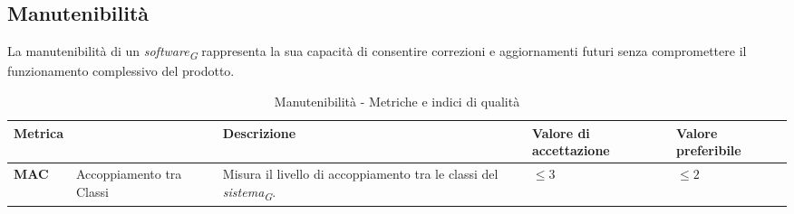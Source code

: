 \subsection{Manutenibilità}
La manutenibilità di un \textit{software}\textsubscript{\textit{G}} rappresenta la sua capacità di consentire correzioni e aggiornamenti futuri senza compromettere il funzionamento complessivo del prodotto.  
\begin{table}[H]
    \centering
    \begin{tabular}{|C{1.5cm}|L{3cm}|L{4cm}|L{2.5cm}|L{2.5cm}|}
        \hline
        \textbf{Metrica} &  & \textbf{Descrizione} & \textbf{Valore di accettazione} & \textbf{Valore preferibile} \\
        \hline
        \textbf{MAC} & Accoppiamento tra Classi & Misura il livello di accoppiamento tra le classi del \textit{sistema}\textsubscript{\textit{G}}. & $\leq 3$ & $\leq 2$ \\
        \hline
    \end{tabular}
    \caption{Manutenibilità - Metriche e indici di qualità}
    \label{tab:manutenibilità_qualita_prodotto}
\end{table}